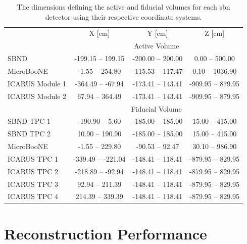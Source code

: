 \begin{table}[h!]
\begin{tabular}{lccc}
 & \multicolumn{1}{c}{X [cm]} & \multicolumn{1}{c}{Y [cm]} & \multicolumn{1}{c}{Z [cm]} \\ \cline{2-4} 
 & \multicolumn{3}{c}{Active Volume} \\ \cline{2-4} 
SBND & -199.15 -- \phantom{-}199.15 & -200.00 -- 200.00 & \phantom{-00}0.00 -- \phantom{0}500.00 \\
MicroBooNE & \phantom{00}-1.55 -- \phantom{-}254.80 & -115.53 -- 117.47 & \phantom{-00}0.10 -- 1036.90 \\
ICARUS Module 1 & -364.49 -- \phantom{0}-67.94 & -173.41 -- 143.41 & -909.95 -- \phantom{0}879.95 \\
ICARUS Module 2 & \phantom{-0}67.94 -- \phantom{-}364.49 & -173.41 -- 143.41 & -909.95 -- \phantom{0}879.95 \\ \cline{2-4} 
 & \multicolumn{3}{c}{Fiducial Volume} \\ \cline{2-4} 
SBND TPC 1 & -190.90 -- \phantom{-00}5.60 & -185.00 -- 185.00 & \phantom{-0}15.00 -- 415.00 \\
SBND TPC 2 & \phantom{-0}10.90 -- \phantom{-}190.90 & -185.00 -- 185.00 & \phantom{-0}15.00 -- 415.00 \\
MicroBooNE & \phantom{00}-1.55 -- \phantom{-}229.80 & \phantom{0}-90.53 -- \phantom{0}92.47 & \phantom{-0}30.10 -- 986.90 \\
ICARUS TPC 1 & -339.49 -- -221.04 & -148.41 -- 118.41 & -879.95 -- 829.95 \\
ICARUS TPC 2 & -218.89 -- \phantom{0}-92.94 & -148.41 -- 118.41 & -879.95 -- 829.95 \\
ICARUS TPC 3 & \phantom{-0}92.94 -- \phantom{-}211.39 & -148.41 -- 118.41 & -879.95 -- 829.95 \\
ICARUS TPC 4 & \phantom{-}214.39 -- \phantom{-}339.39 & -148.41 -- 118.41 & -879.95 -- 829.95
\end{tabular}
\caption[The active and fiducial volumes of the \gls{sbn} detectors.]{The dimensions defining the active and fiducial volumes for each \gls{sbn} detector using their respective coordinate systems.} \label{table:active_and_fiducial_volumes}
\end{table}

\chapter{Reconstruction Performance}
\label{app:reconstruction_performance}


